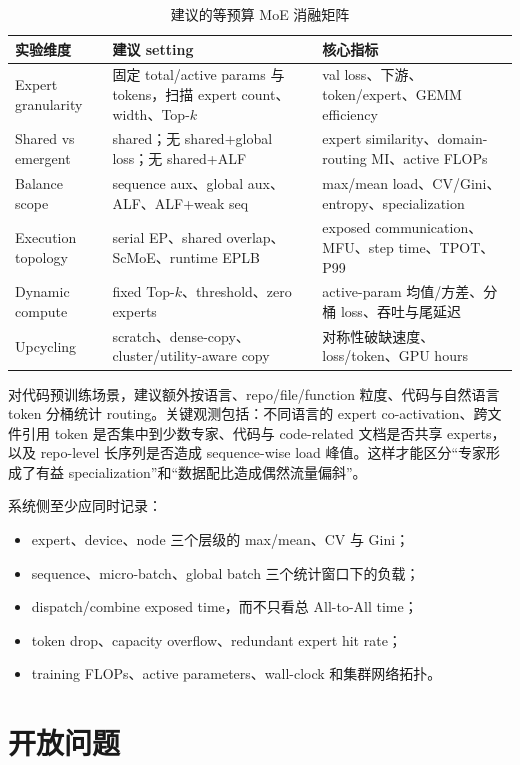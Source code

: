 \documentclass[10pt,a4paper,fontset=none]{ctexart}
\begin{document}
\begin{table}[htbp]
\centering
\caption{建议的等预算 MoE 消融矩阵}
\label{zh:tab:experiments}
\small
\begin{tabularx}{\textwidth}{p{}p{}Y}
\toprule
实验维度 & 建议 setting & 核心指标 \\
\midrule
Expert granularity & 固定 total/active params 与 tokens，扫描 expert count、width、Top-$k$ & val loss、下游、token/expert、GEMM efficiency \\
Shared vs emergent & shared；无 shared+global loss；无 shared+ALF & expert similarity、domain-routing MI、active FLOPs \\
Balance scope & sequence aux、global aux、ALF、ALF+weak seq & max/mean load、CV/Gini、entropy、specialization \\
Execution topology & serial EP、shared overlap、ScMoE、runtime EPLB & exposed communication、MFU、step time、TPOT、P99 \\
Dynamic compute & fixed Top-$k$、threshold、zero experts & active-param 均值/方差、分桶 loss、吞吐与尾延迟 \\
Upcycling & scratch、dense-copy、cluster/utility-aware copy & 对称性破缺速度、loss/token、GPU hours \\
\bottomrule
\end{tabularx}
\end{table}

对代码预训练场景，建议额外按语言、repo/file/function 粒度、代码与自然语言 token 分桶统计 routing。关键观测包括：不同语言的 expert co-activation、跨文件引用 token 是否集中到少数专家、代码与 code-related 文档是否共享 experts，以及 repo-level 长序列是否造成 sequence-wise load 峰值。这样才能区分“专家形成了有益 specialization”和“数据配比造成偶然流量偏斜”。

系统侧至少应同时记录：
\begin{itemize}
  \item expert、device、node 三个层级的 max/mean、CV 与 Gini；
  \item sequence、micro-batch、global batch 三个统计窗口下的负载；
  \item dispatch/combine exposed time，而不只看总 All-to-All time；
  \item token drop、capacity overflow、redundant expert hit rate；
  \item training FLOPs、active parameters、wall-clock 和集群网络拓扑。
\end{itemize}

\section{开放问题}
\end{document}
